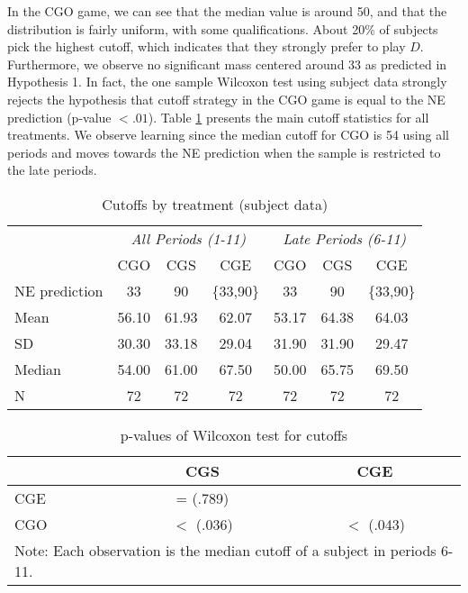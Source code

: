 \documentclass[12pt, letterpaper]{article}
\theoremstyle{plain}
\begin{document}
 In the CGO game, we can see that the median value is around 50, and that the distribution is fairly uniform, with some qualifications. About 20\% of subjects pick the highest cutoff, which indicates that they strongly prefer to play $D$. Furthermore, we observe no significant mass centered around 33 as predicted in Hypothesis 1. In fact, the one sample Wilcoxon test using subject data strongly rejects the hypothesis that cutoff strategy in the CGO game is equal to the NE prediction (p-value $< .01$). Table \ref{tab(cutoffs)} presents the main cutoff statistics for all treatments. We observe learning since the median cutoff for CGO is 54 using all periods and moves towards the NE prediction when the sample is restricted to the late periods. \\

\begin{table}[!ht]
\centering\caption{Cutoffs by treatment (subject data)}

\begin{tabular}{lccc|ccc}
\hline
& \multicolumn{3}{c}{\textit{All Periods (1-11)}} & \multicolumn{3}{c}{\textit{Late Periods (6-11)}}\\
 & CGO & CGS  & CGE  & CGO & CGS  & CGE\\
  \hline
  NE prediction & 33 & 90 & \{33,90\} & 33 & 90 & \{33,90\}\\
  Mean & 56.10 & 61.93 & 62.07 &  53.17 &  64.38 & 64.03 \\
  SD & 30.30 & 33.18 & 29.04 &  31.90 &  31.90 & 29.47 \\
  Median & 54.00 & 61.00 & 67.50 &  50.00 &  65.75 & 69.50 \\
    N & 72 &  72 & 72 & 72 &  72 & 72 \\
\hline
\end{tabular}

\label{tab(cutoffs)}
\end{table}
\begin{table}[ht]
\centering\caption{ p-values of Wilcoxon test for cutoffs }

\begin{tabular}{l|cc}
& CGS & CGE \\
\hline
CGE & = (.789)& \\
CGO & $<$ (.036) & $<$ (.043)\\
\hline
 \multicolumn{3}{p{.35\textwidth}}{\scriptsize{Note: Each observation is the median cutoff of a subject in periods 6-11.}}\\ 
\end{tabular}

\label{tab(cutoff-pvalue)}
\end{table}
\end{document}
